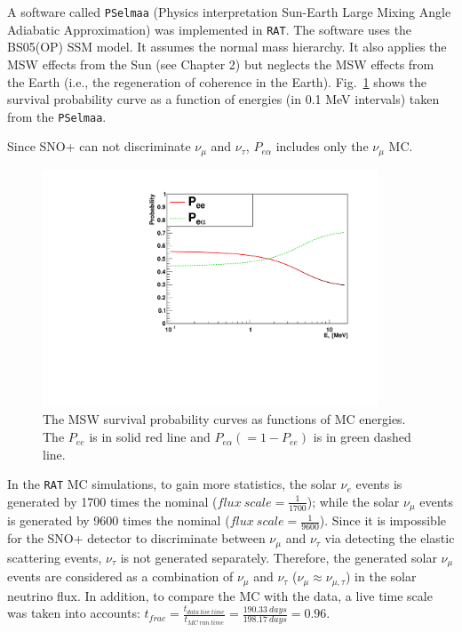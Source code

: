 A software called \texttt{PSelmaa} (Physics interpretation Sun-Earth Large Mixing Angle Adiabatic
Approximation) was implemented in \texttt{RAT}\cite{fady_pselmaa}. The software uses the BS05(OP) SSM model. It assumes the normal mass hierarchy. It also applies the MSW effects from the Sun (see Chapter 2) but neglects the MSW effects from the Earth (i.e., the regeneration of coherence in the Earth). Fig.~\ref{fig:pselmaa_curves} shows the survival probability curve as a function of energies (in 0.1 MeV intervals) taken from the \texttt{PSelmaa}.

Since SNO+ can not discriminate $\nu_\mu$ and $\nu_\tau$, $P_{e\alpha}$ includes only the $\nu_\mu$ MC.

\begin{figure}[!htb]
	\centering
	\includegraphics[width=10cm]{PSelmaa_bs05op.pdf}
	\caption{The MSW survival probability curves as functions of MC energies. The $P_{ee}$ is in solid red line and $P_{e\alpha}(=1-P_{ee})$ is in green dashed line.}
	\label{fig:pselmaa_curves}
\end{figure}


In the \texttt{RAT} MC simulations, to gain more statistics, the solar $\nu_e$ events is generated by 1700 times the nominal ($flux~scale = \frac{1}{1700}$); while the solar $\nu_\mu$ events is generated by 9600 times the nominal ($flux~scale=\frac{1}{9600}$). Since it is impossible for the SNO+ detector to discriminate between $\nu_\mu$ and $\nu_\tau$ via detecting the elastic scattering events, $\nu_\tau$ is not generated separately. Therefore, the generated solar $\nu_\mu$ events are considered as a combination of $\nu_\mu$ and $\nu_\tau$ ($\nu_\mu\approx\nu_{\mu,\tau}$) in the solar neutrino flux. In addition, to compare the MC with the data, a live time scale was taken into accounts: $t_{frac}=\frac{t_{data~live~time}}{t_{MC~run~time}}=\frac{190.33~days}{198.17~days} = 0.96$.

